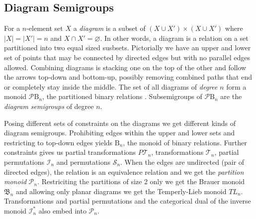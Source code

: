 \documentclass{amsart}
\newcommand{\BinRel}{\text{B}}
\newcommand{\InvMon}{\mathcal I}
\newcommand{\DualInvMon}{{\mathcal I}^*}
\newcommand{\FullTrans}{\mathcal T}
\newcommand{\Symmetric}{\mathcal S}
\newcommand{\Brauer}{\mathfrak B}
\newcommand{\Partition}{\mathcal P}
\newcommand{\todo}[1]{ \textsf{\color{red}{[TODO:  #1 ]}}}
\begin{document}
\subsection{Diagram Semigroups}

For a $n$-element set $X$ a \emph{diagram} is a subset of $(X\cup X')\times (X\cup X')$ where $|X|=|X'|=n$ and $X\cap X'=\varnothing$.
In other words, a diagram is a relation on a set partitioned into two equal sized susbsets.
Pictorially we have an upper and lower set of points that may be connected by directed edges but with no parallel edges allowed.
Combining diagrams is stacking one on the top of the other and follow the arrows top-down and bottom-up, possibly removing combined paths that end or completely stay inside the middle. \todo{This isn't very precise, is it?}
The set of all diagrams of \emph{degree} $n$ form a monoid $\Partition\BinRel_n$, the partitioned binary relations \cite{PartBinRel2013}. Subsemigroups of $\Partition\BinRel_n$ are the \emph{diagram semigroups} of degree $n$.

Posing different sets of constraints on the diagrams we get different kinds of diagram semigroups.
Prohibiting edges within the upper and lower sets and restricting to top-down edges yields $\BinRel_n$, the monoid of binary relations. Further constraints gives us partial transformations $P\FullTrans_n$, transformations $\FullTrans_n$, partial permutations $\InvMon_n$ and permutations $\Symmetric_n$.
When the edges are undirected (pair of directed edges), the relation is an equivalence relation and we get the \emph{partition monoid} $\Partition_n$.
Restriciting the partitions of size 2 only we get the Brauer monoid $\Brauer_n$ and allowing only planar diagrams we get the Temperly-Lieb monoid $TL_n$.
Transformations and partial permutations and the categorical dual of the inverse monoid $\DualInvMon_n$ also embed into $\Partition_n$.
\todo{Ask JE for quick explanation why $P\FullTrans_n$ does not embed into $\Partition_n$.}
\end{document}
